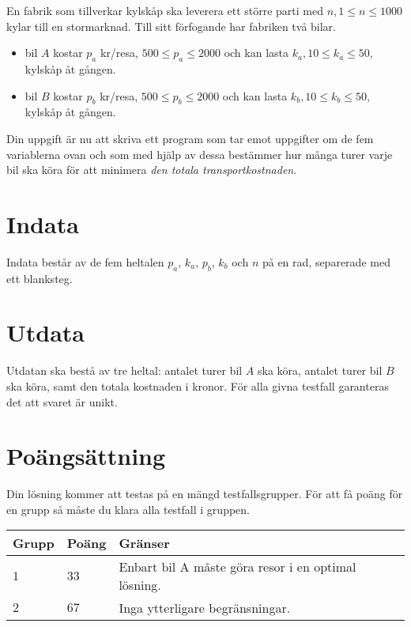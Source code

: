 
En fabrik som tillverkar kylskåp ska leverera ett större parti med $n, 1 \le n \le 1000$ kylar till en stormarknad. Till sitt förfogande har fabriken två bilar.

\begin{itemize}
\item bil $A$ kostar $p_a$ kr/resa, $500 \le p_a \le 2000$ och kan lasta $k_a, 10 \le k_a \le 50$, kylskåp åt gången.
\item bil $B$ kostar $p_b$ kr/resa, $500 \le p_b \le 2000$ och kan lasta $k_b, 10 \le k_b \le 50$, kylskåp åt gången.
\end{itemize}

Din uppgift är nu att skriva ett program som tar emot uppgifter om de fem variablerna ovan och som med hjälp av dessa bestämmer hur många turer varje bil ska köra för att minimera \emph{den totala transportkostnaden}.

\section*{Indata}
Indata består av de fem heltalen $p_a$, $k_a$, $p_b$, $k_b$ och $n$ på en rad, separerade med ett blanksteg.

\section*{Utdata}
Utdatan ska bestå av tre heltal: antalet turer bil $A$ ska köra, antalet turer bil $B$ ska köra, samt den totala kostnaden i kronor.
För alla givna testfall garanteras det att svaret är unikt.

\section*{Poängsättning}
Din lösning kommer att testas på en mängd testfallsgrupper.
För att få poäng för en grupp så måste du klara alla testfall i gruppen.



\noindent
\begin{tabular}{| l | l | p{12cm} |}
  \hline
  \textbf{Grupp} & \textbf{Poäng} & \textbf{Gränser} \\ \hline
  $1$    & $33$        &  Enbart bil A måste göra resor i en optimal lösning. \\ \hline
  $2$    & $67$        &  Inga ytterligare begränsningar. \\ \hline
\end{tabular}

